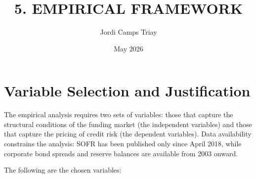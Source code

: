 \documentclass[12pt,a4paper]{article}
\title{\textbf{5. EMPIRICAL FRAMEWORK}}
\author{Jordi Camps Triay}
\date{May 2026}
\begin{document}
\maketitle
\tableofcontents
\newpage

\section{Variable Selection and Justification}

The empirical analysis requires two sets of variables: those that capture the structural conditions of the funding market (the independent variables) and those that capture the pricing of credit risk (the dependent variables). Data availability constrains the analysis: SOFR has been published only since April 2018, while corporate bond spreads and reserve balances are available from 2003 onward.

The following are the chosen variables:
\end{document}
